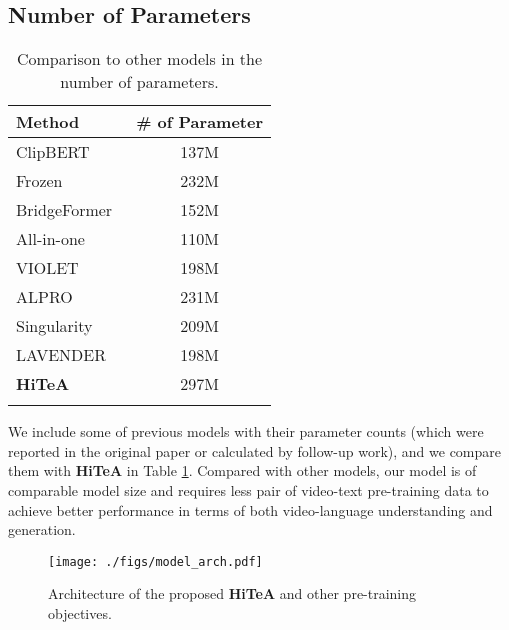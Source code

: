 \documentclass[10pt,twocolumn,letterpaper]{article}
\newlength\savewidth
\newcommand\shline{\noalign{\global\savewidth\arrayrulewidth\global\arrayrulewidth 1pt}\hline\noalign{\global\arrayrulewidth\savewidth}}
\newcommand{\tablestyle}[2]{\setlength{\tabcolsep}{#1}\renewcommand{\arraystretch}{#2}\centering\small}
\newcommand{\modelname}{\textbf{HiTeA}\xspace}
\begin{document}
\subsection{Number of Parameters}
\begin{table}[t]
\vspace{1em}
\tablestyle{7pt}{1.05}
\begin{tabular}{lc}
\shline
Method & \# of Parameter \\
\hline
ClipBERT~\cite{lei2021clipbert} & 137M \\
Frozen~\cite{bain2021frozen} & 232M \\
BridgeFormer~\cite{ge2022bridgeformer} & 152M \\
All-in-one~\cite{wang2022allinone} & 110M \\
VIOLET~\cite{fu2021violet} & 198M \\
ALPRO~\cite{li2022alpro} & 231M \\
Singularity~\cite{lei2022singularity} & 209M \\
LAVENDER~\cite{fu2021violet} & 198M \\
\hline
\modelname & 297M \\
\shline
\end{tabular}
\caption{Comparison to other models in the number of parameters.}
\label{tab:model_params}
\vspace{-2ex}
\end{table}

We include some of previous models with their parameter counts (which were reported in the original paper or calculated by follow-up work), and we compare them with \modelname in Table \ref{tab:model_params}. Compared with other models, our model is of comparable model size and requires less pair of video-text pre-training data to achieve better performance in terms of both video-language understanding and generation. 


\begin{figure}
    \centering
    \texttt{[image: ./figs/model\_arch.pdf]}
    \caption{Architecture of the proposed \modelname and other pre-training objectives.}
\label{fig:model}
\end{figure}
\end{document}
